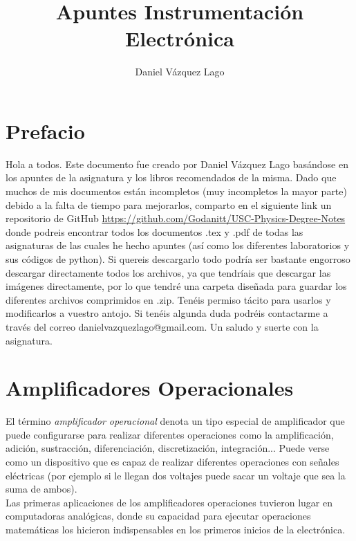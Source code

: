 \documentclass[12pt,a4paper]{article}
\author{Daniel Vázquez Lago}
\title{Apuntes Instrumentación Electrónica}
\numberwithin{equation}{section}
\numberwithin{figure}{section}
\begin{document}
\maketitle

\newpage

\tableofcontents

\newpage
\section*{Prefacio}

Hola a todos. Este documento fue creado por Daniel Vázquez Lago basándose en los apuntes de la asignatura y los libros recomendados de la misma. Dado que muchos de mis documentos están incompletos (muy incompletos la mayor parte) debido a la falta de tiempo para mejorarlos, comparto en el siguiente link un repositorio de GitHub \url{https://github.com/Godanitt/USC-Physics-Degree-Notes} donde podreis encontrar todos los documentos .tex y .pdf de todas las asignaturas de las cuales he hecho apuntes (así como los diferentes laboratorios y sus códigos de python). Si quereis descargarlo todo podría ser bastante engorroso descargar directamente todos los archivos, ya que tendríais que descargar las imágenes directamente, por lo que tendré una carpeta diseñada para guardar los diferentes archivos comprimidos en .zip. Tenéis permiso tácito para usarlos y modificarlos a vuestro antojo. Si tenéis algunda duda podréis contactarme a través del correo danielvazquezlago@gmail.com. Un saludo y suerte con la asignatura.

\newpage

\section{Amplificadores Operacionales}

El término \textit{amplificador operacional} denota un tipo especial de amplificador que puede configurarse para realizar diferentes operaciones como la amplificación, adición, sustracción, diferenciación, discretización, integración... Puede verse como un dispositivo que es capaz de realizar diferentes operaciones con señales eléctricas (por ejemplo si le llegan dos voltajes puede sacar un voltaje que sea la suma de ambos). \\

Las primeras aplicaciones de los amplificadores operaciones tuvieron lugar en computadoras analógicas, donde su capacidad para ejecutar operaciones matemáticas los hicieron indispensables en los primeros inicios de la electrónica. \\
 
\end{document}
